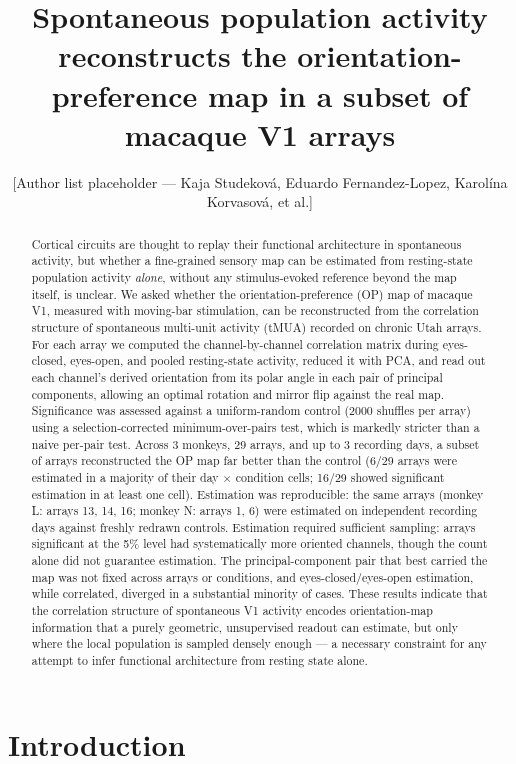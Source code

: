 \documentclass[11pt]{article}
\title{Spontaneous population activity reconstructs the orientation-preference
map in a subset of macaque V1 arrays}
\author{[Author list placeholder --- Kaja Studekov\'a, Eduardo Fernandez-Lopez,
Karol\'ina Korvasov\'a, et al.]}
\date{}
\begin{document}
\maketitle

\begin{abstract}
Cortical circuits are thought to replay their functional architecture in
spontaneous activity, but whether a fine-grained sensory map can be estimated
from resting-state population activity \emph{alone}, without any
stimulus-evoked reference beyond the map itself, is unclear. We asked whether
the orientation-preference (OP) map of macaque V1, measured with moving-bar
stimulation, can be reconstructed from the correlation structure of
spontaneous multi-unit activity (tMUA) recorded on chronic Utah arrays. For
each array we computed the channel-by-channel correlation matrix during
eyes-closed, eyes-open, and pooled resting-state activity, reduced it with
PCA, and read out each channel's derived orientation from its polar angle in
each pair of principal components, allowing an optimal rotation and mirror
flip against the real map. Significance was assessed against a
uniform-random control (2000 shuffles per array) using a selection-corrected
minimum-over-pairs test, which is markedly stricter than a naive per-pair
test. Across 3 monkeys, 29 arrays, and up to 3 recording days, a subset of
arrays reconstructed the OP map far better than the control (6/29 arrays
were estimated in a majority of their day $\times$ condition cells; 16/29 showed
significant estimation in at least one cell). Estimation was reproducible: the same arrays
(monkey L: arrays 13, 14, 16; monkey N: arrays 1, 6) were estimated on independent
recording days against freshly redrawn controls. Estimation required
sufficient sampling: arrays significant at the 5\% level had systematically
more oriented channels, though the count alone did not guarantee estimation.
The principal-component pair that best carried the map was not fixed across
arrays or conditions, and eyes-closed/eyes-open estimation, while correlated,
diverged in a substantial minority of cases. These results indicate that the
correlation structure of spontaneous V1 activity encodes orientation-map
information that a purely geometric, unsupervised readout can estimate, but
only where the local population is sampled densely enough --- a necessary
constraint for any attempt to infer functional architecture from resting
state alone.
\end{abstract}

\section{Introduction}
\end{document}
